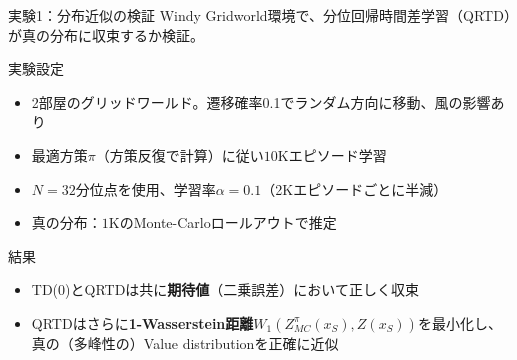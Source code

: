 \documentclass[aspectratio=169, dvipdfmx, 11pt]{beamer}
\begin{document}
\begin{frame}{実験1：分布近似の検証}
  Windy Gridworld環境で、分位回帰時間差学習（QRTD）が真の分布に収束するか検証。

  \begin{block}{実験設定}
    \begin{itemize}
      \item 2部屋のグリッドワールド。遷移確率0.1でランダム方向に移動、風の影響あり
      \item 最適方策$\pi$（方策反復で計算）に従い$10$Kエピソード学習
      \item $N = 32$分位点を使用、学習率$\alpha = 0.1$（2Kエピソードごとに半減）
      \item 真の分布：$1$KのMonte-Carloロールアウトで推定
    \end{itemize}
  \end{block}
  \vfill
  \begin{exampleblock}{結果}
    \begin{itemize}
      \item TD(0)とQRTDは共に\textbf{期待値}（二乗誤差）において正しく収束
      \item QRTDはさらに\textbf{1-Wasserstein距離}$W_1(Z^\pi_{MC}(x_S), Z(x_S))$を最小化し、\\
        真の（多峰性の）Value distributionを正確に近似
    \end{itemize}
  \end{exampleblock}
\end{frame}
\end{document}
